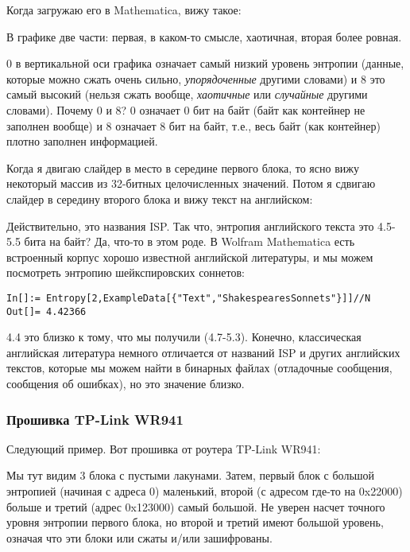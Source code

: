 Когда загружаю его в Mathematica, вижу такое:



В графике две части: первая, в каком-то смысле, хаотичная, вторая более ровная.

0 в вертикальной оси графика означает самый низкий уровень энтропии
(данные, которые можно сжать очень сильно, \emph{упорядоченные} другими словами) 
и 8 это самый высокий (нельзя сжать вообще, \emph{хаотичные} или \emph{случайные} другими словами).
Почему 0 и 8? 0 означает 0 бит на байт (байт как контейнер не заполнен вообще) 
и 8 означает 8 бит на байт, т.е., весь байт (как контейнер) плотно заполнен информацией.

Когда я двигаю слайдер в место в середине первого блока, то ясно вижу некоторый массив из 32-битных целочисленных значений.
Потом я сдвигаю слайдер в середину второго блока и вижу текст на английском:



Действительно, это названия ISP.
Так что, энтропия английского текста это 4.5-5.5 бита на байт? Да, что-то в этом роде.
В Wolfram Mathematica есть встроенный корпус хорошо известной английской литературы, и мы можем посмотреть энтропию
шейкспировских соннетов:

\begin{lstlisting}[style=custommath]
In[]:= Entropy[2,ExampleData[{"Text","ShakespearesSonnets"}]]//N
Out[]= 4.42366
\end{lstlisting}

4.4 это близко к тому, что мы получили (4.7-5.3). 
Конечно, классическая английская литература немного отличается от названий ISP и других английских текстов, которые мы
можем найти в бинарных файлах (отладочные сообщения, сообщения об ошибках), но это значение близко.

\subsubsection{Прошивка TP-Link WR941}

Следующий пример. Вот прошивка от роутера TP-Link WR941:



Мы тут видим 3 блока с пустыми лакунами.
Затем, первый блок с большой энтропией (начиная с адреса 0) маленький,
второй (с адресом где-то на 0x22000) больше и третий (адрес 0x123000) самый
большой.
Не уверен насчет точного уровня энтропии первого блока, но второй и третий имеют большой уровень, означая что эти блоки
или сжаты и/или зашифрованы.

